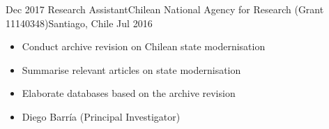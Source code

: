 \begin{experiences}
  \emptySeparator 
  \experience 
    {Dec 2017} {Research Assistant}{Chilean National Agency for Research (Grant 11140348)}{Santiago, Chile} {Jul 2016}
    {\begin{itemize}
    \item Conduct archive revision on Chilean state modernisation
    \item Summarise relevant articles on state modernisation
    \item Elaborate databases based on the archive revision
    \item Diego Barría {\small (Principal Investigator)}
    \end{itemize}}
    {}
\end{experiences}
\vspace{-2mm}

